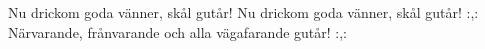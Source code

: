 

\beginverse*
Nu drickom goda vänner, skål gutår!
Nu drickom goda vänner, skål gutår!
:,: Närvarande, frånvarande 
och alla vägafarande gutår! :,:
\endverse

\vspace{5mm}
\endsong